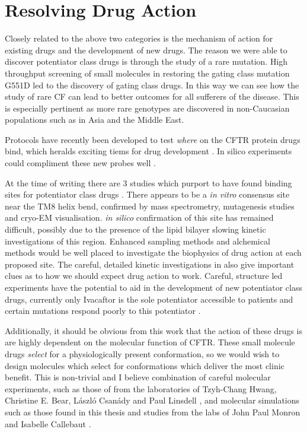 \section{Resolving Drug Action}
Closely related to the above two categories is the mechanism of action for existing drugs and the development of new drugs. The reason we were able to discover potentiator class drugs is through the study of a rare mutation. High throughput screening of small molecules in restoring the gating class mutation G551D led to the discovery of gating class drugs. In this way we can see how the study of rare CF can lead to better outcomes for all sufferers of the disease. This is especially pertinent as more rare genotypes are discovered in non-Caucasian populations such as in Asia and the Middle East.  

Protocols have recently been developed to test \textit{where} on the CFTR protein drugs bind, which heralds exciting tiems for drug development \cite{laselva2022}. In silico experiments could compliment these new probes well \cite{}.

At the time of writing there are 3 studies which purport to have found binding sites for potentiator class drugs \cite{}. There appears to be a \textit {in vitro} consensus site near the TM8 helix bend, confirmed by mass spectrometry, mutagenesis studies and cryo-EM visualisation. \textit{in silico} confirmation of this site has remained difficult, possibly due to the presence of the lipid bilayer slowing kinetic investigations of this region. Enhanced sampling methods and alchemical methods would be well placed to investigate the biophysics of drug action at each proposed site. The careful, detailed kinetic investigations in \cite{csanady2019} also give important clues as to how we should expect drug action to work. Careful, structure led experiments have the potential to aid in the development of new potentiator class drugs, currently only Ivacaftor is the sole potentiator accessible to patients and certain mutations respond poorly to this potentiator \cite{phuan2018, vangoor2014}. 

Additionally, it should be obvious from this work that the action of these drugs is are highly dependent on the molecular function of CFTR. These small molecule drugs \textit{select} for a physiologically present conformation, so we would wish to design molecules which select for conformations which deliver the most clinic benefit. This is non-trivial and I believe  combination of careful molecular experiments, such as those of from the laboratories of Tzyh-Chang Hwang,  Christine E. Bear, L\'aszl\'o Csan\'ady and Paul Linsdell \cite{linsdell2018, csanady2019, zhang2017b}, and molecular simulations such as those found in this thesis and studies from the labs of John Paul Monron and Isabelle Callebaut \cite{Hoffmann2018}.
